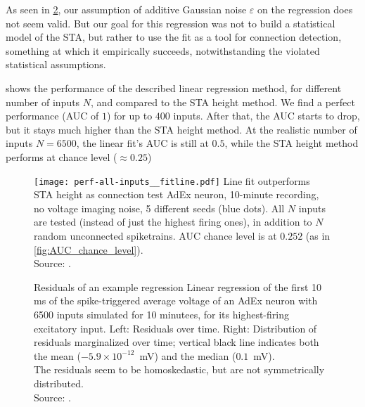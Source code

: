 As seen in \cref{fig:linefit-residuals}, our assumption of additive Gaussian noise $ε$ on the regression does not seem valid. But our goal for this regression was not to build a statistical model of the STA, but rather to use the fit as a tool for connection detection, something at which it empirically succeeds, notwithstanding the violated statistical assumptions.


 shows the performance of the described linear regression method, for different number of inputs $N$, and compared to the STA height method. We find a perfect performance (AUC of $1$) for up to $400$ inputs. After that, the AUC starts to drop, but it stays much higher than the STA height method. At the realistic number of inputs $N = 6500$, the linear fit's AUC is still at $0.5$, while the STA height method performs at chance level ($≈ 0.25$)

\begin{figure}
    \texttt{[image: perf-all-inputs\_\_fitline.pdf]}
    \captionn
        {Line fit outperforms STA height as connection test}
        {AdEx neuron, 10-minute recording, no voltage imaging noise,  5 different seeds (blue dots). All $N$ inputs are tested (instead of just the highest firing ones), in addition to $N$ random unconnected spiketrains. AUC chance level is at $0.252$ (as in \cref{fig:AUC_chance_level}). \\
        Source: .}
    \label{fig:N_sweep__AUC__upstroke_vs_STA}
\end{figure}



\begin{figure}
    \captionn
        {Residuals of an example regression}
        {
        Linear regression of the first 10 ms of the spike-triggered average voltage of an AdEx neuron with 6500 inputs simulated for 10 minutees, for its highest-firing excitatory input.
        Left: Residuals over time.
        Right: Distribution of residuals marginalized over time; vertical black line indicates both the mean ($-5.9 × 10^{-12}$~mV) and the median ($0.1$~mV).\\
        The residuals seem to be homoskedastic, but are not symmetrically distributed.\\
        Source: .
        }
    \label{fig:linefit-residuals}
\end{figure}


